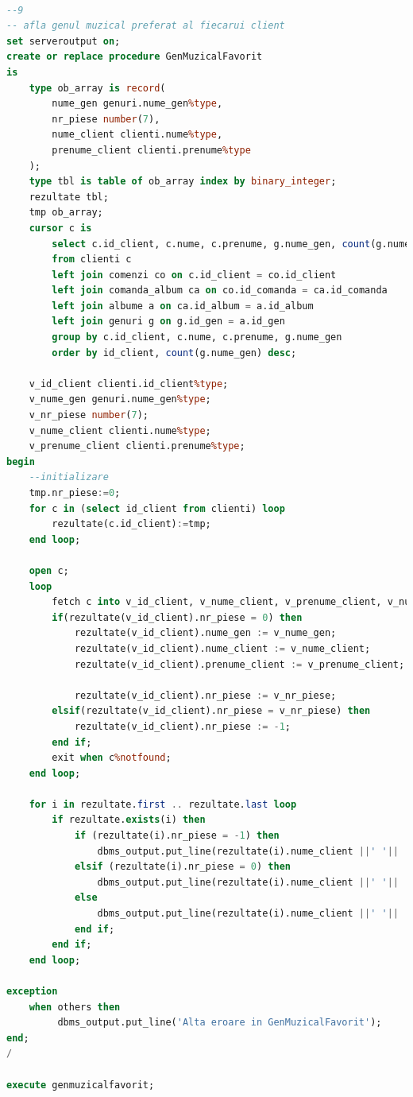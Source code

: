 \documentclass{article}
\begin{document}
\begin{lstlisting}[language=SQL, title=Cerinta 9]

--9
-- afla genul muzical preferat al fiecarui client
set serveroutput on;
create or replace procedure GenMuzicalFavorit
is
    type ob_array is record(
        nume_gen genuri.nume_gen%type,
        nr_piese number(7),
        nume_client clienti.nume%type,
        prenume_client clienti.prenume%type
    );
    type tbl is table of ob_array index by binary_integer;
    rezultate tbl;
    tmp ob_array;
    cursor c is
        select c.id_client, c.nume, c.prenume, g.nume_gen, count(g.nume_gen)
        from clienti c 
        left join comenzi co on c.id_client = co.id_client
        left join comanda_album ca on co.id_comanda = ca.id_comanda
        left join albume a on ca.id_album = a.id_album
        left join genuri g on g.id_gen = a.id_gen
        group by c.id_client, c.nume, c.prenume, g.nume_gen
        order by id_client, count(g.nume_gen) desc;
        
    v_id_client clienti.id_client%type;
    v_nume_gen genuri.nume_gen%type;
    v_nr_piese number(7);
    v_nume_client clienti.nume%type;
    v_prenume_client clienti.prenume%type;
begin
    --initializare
    tmp.nr_piese:=0;
    for c in (select id_client from clienti) loop
        rezultate(c.id_client):=tmp;
    end loop;

    open c;
    loop
        fetch c into v_id_client, v_nume_client, v_prenume_client, v_nume_gen, v_nr_piese;
        if(rezultate(v_id_client).nr_piese = 0) then
            rezultate(v_id_client).nume_gen := v_nume_gen;
            rezultate(v_id_client).nume_client := v_nume_client;
            rezultate(v_id_client).prenume_client := v_prenume_client;

            rezultate(v_id_client).nr_piese := v_nr_piese;
        elsif(rezultate(v_id_client).nr_piese = v_nr_piese) then
            rezultate(v_id_client).nr_piese := -1;
        end if;
        exit when c%notfound;
    end loop;
    
    for i in rezultate.first .. rezultate.last loop
        if rezultate.exists(i) then
            if (rezultate(i).nr_piese = -1) then
                dbms_output.put_line(rezultate(i).nume_client ||' '||  rezultate(i).prenume_client ||' nu are un gen preferat');
            elsif (rezultate(i).nr_piese = 0) then
                dbms_output.put_line(rezultate(i).nume_client ||' '||  rezultate(i).prenume_client ||' nu a efectuat nicio comanda pana acum');
            else
                dbms_output.put_line(rezultate(i).nume_client ||' '||  rezultate(i).prenume_client ||' are genul preferat ' || rezultate(i).nume_gen ||', cu '|| rezultate(i).nr_piese||' albume comandate de acest gen');
            end if;
        end if;
    end loop;
    
exception
    when others then
         dbms_output.put_line('Alta eroare in GenMuzicalFavorit');
end;
/

execute genmuzicalfavorit;
\end{lstlisting}
\vspace{0.5cm}
\end{document}
